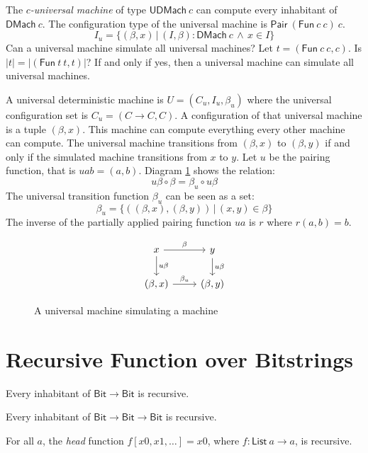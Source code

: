 \documentclass[10pt,statementpaper]{memoir}
\theoremstyle{definition}
\newcommand\Bit{\mathsf{Bit}}
\newcommand\Pair[2]{\mathsf{Pair}~#1~#2}
\newcommand\UDMach[1]{\mathsf{UDMach}~#1}
\newcommand\DMach[1]{\mathsf{DMach}~#1}
\newcommand\List[1]{\mathsf{List}~#1}
\newcommand\sfFun{\mathsf{Fun}}
\newcommand\Fun[2]{\sfFun~#1~#2}
\begin{document}
The \emph{$c$-universal machine} of type $\UDMach{c}$ can compute every inhabitant of $\DMach{c}$.
The configuration type of the universal machine is $\Pair{(\Fun{c}{c})}{c}$.
\[
    I_u = \{ (\beta,x) \,|\, (I,\beta) : \DMach c \,\wedge\, x \in I \}
\]
Can a universal machine simulate all universal machines?
Let $t = (\Fun{c}{c},c)$.
Is $|t| = |(\Fun{t}{t},t)|$?
If and only if yes, then a universal machine can simulate all universal machines.

A universal deterministic machine is $U = (C_u, I_u, \beta_u)$
where the universal configuration set is $C_u = (C \to C, C)$.
A configuration of that universal machine is a tuple $(\beta, x)$.
This machine can compute everything every other machine can compute.
The universal machine transitions from $(\beta, x)$ to $(\beta, y)$
if and only if the simulated machine transitions from $x$ to $y$.
Let $u$ be the pairing function, that is $uab = (a,b)$.
Diagram \ref{f:univ} shows the relation:
\begin{equation}
    u \beta \circ \beta = \beta_u \circ u \beta
\end{equation}
The universal transition function $\beta_u$ can be seen as a set:
\begin{equation}
    \beta_u = \{ ((\beta,x), (\beta,y)) \,|\, (x,y) \in \beta \}
\end{equation}
The inverse of the partially applied pairing function $u a$ is $r$
where $r (a,b) = b$.

\begin{figure}[h]
\[
\begin{tikzcd}
    x \arrow[r, "\beta"] \arrow[d, "u \beta"] & y \arrow[d, "u \beta"]
    \\
    (\beta, x) \arrow[r, "\beta_u"] & (\beta, y)
\end{tikzcd}
\]
    \caption{A universal machine simulating a machine}
    \label{f:univ}
\end{figure}

\section{Recursive Function over Bitstrings}

Every inhabitant of $\Bit \to \Bit$ is recursive.

Every inhabitant of $\Bit \to \Bit \to \Bit$ is recursive.

For all $a$, the \emph{head} function $f [x 0, x 1, \ldots] = x 0$,
where $f : \List{a} \to a$, is recursive.
\end{document}
